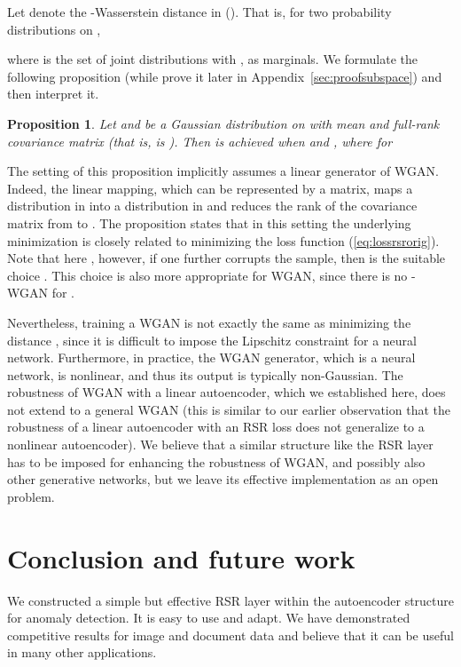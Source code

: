 \documentclass{article} \usepackage{iclr2020_conference,times}
\def\eqref#1{(\ref{#1})}
\newtheorem{proposition}{Proposition}[section]
\begin{document}
Let  denote the -Wasserstein distance in  (). That is, for two probability distributions  on ,

where  is the set of joint distributions with ,  as marginals. We formulate the following proposition (while prove it later in Appendix~\ref{sec:proofsubspace}) and then interpret it.


\begin{proposition}\label{prop:subspace}
Let  and 
 be a Gaussian distribution on  with mean  and full-rank covariance matrix  (that is,  is ). 
Then 
is achieved when  and 
, 
where for 

\end{proposition}

The setting of this proposition implicitly assumes a linear generator of WGAN. Indeed, the linear mapping, which can be represented by a  matrix, maps a distribution in  into a distribution in 
 and reduces the rank of the covariance matrix from  to . The proposition states that in this setting the underlying minimization is closely related to minimizing the loss function \eqref{eq:lossrsrorig}. Note that here , however, if one further corrupts the sample, then  is the suitable choice \citep{lerman2018overview}. This choice is also more appropriate for WGAN, since there is no -WGAN for . 

Nevertheless, training a WGAN is not exactly the same as minimizing the  distance \citep{gulrajani2017improved}, since it is difficult to impose the Lipschitz constraint for a neural network. 
Furthermore, in practice, the WGAN generator, which is a neural network, is nonlinear, and thus its output is typically non-Gaussian.
The robustness of WGAN with a linear autoencoder, which we established here, does not extend to a general WGAN (this is similar to our earlier observation that the robustness of a linear autoencoder with an RSR loss does not generalize to a nonlinear autoencoder). We believe that a similar structure like the RSR layer has to be imposed for enhancing the robustness of WGAN, and possibly also other generative networks, but we leave its effective implementation as an open problem.















 
 
 
\section{Conclusion and future work} 
\label{sec:conclude}
We constructed a simple but effective RSR layer within the autoencoder structure for anomaly detection. It is easy to use and adapt. 
We have demonstrated competitive results for image and document data and believe that it can be useful in many other applications.
\end{document}
